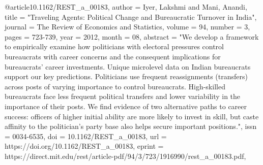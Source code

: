 @article{10.1162/REST_a_00183,
    author = {Iyer, Lakshmi and Mani, Anandi},
    title = "{Traveling Agents: Political Change and Bureaucratic Turnover in India}",
    journal = {The Review of Economics and Statistics},
    volume = {94},
    number = {3},
    pages = {723-739},
    year = {2012},
    month = {08},
    abstract = "{We develop a framework to empirically examine how politicians with electoral pressures control bureaucrats with career concerns and the consequent implications for bureaucrats' career investments. Unique microlevel data on Indian bureaucrats support our key predictions. Politicians use frequent reassignments (transfers) across posts of varying importance to control bureaucrats. High-skilled bureaucrats face less frequent political transfers and lower variability in the importance of their posts. We find evidence of two alternative paths to career success: officers of higher initial ability are more likely to invest in skill, but caste affinity to the politician's party base also helps secure important positions.}",
    issn = {0034-6535},
    doi = {10.1162/REST_a_00183},
    url = {https://doi.org/10.1162/REST\_a\_00183},
    eprint = {https://direct.mit.edu/rest/article-pdf/94/3/723/1916990/rest\_a\_00183.pdf},
}


